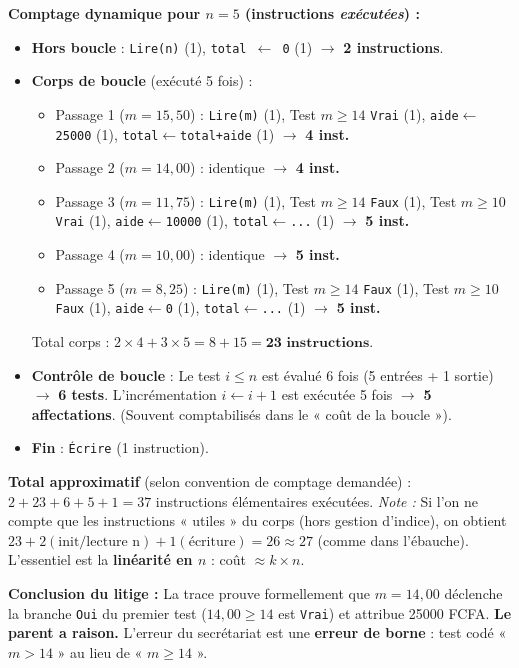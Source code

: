 \documentclass[11pt]{article}
\begin{document}
\begin{exoresolu}
\textbf{Comptage dynamique pour $n = 5$ (instructions \emph{exécutées}) :}
\begin{itemize}
  \item \textbf{Hors boucle} : \texttt{Lire(n)} (1), \texttt{total $\leftarrow$ 0} (1) $\rightarrow$ \textbf{2 instructions}.
  \item \textbf{Corps de boucle} (exécuté 5 fois) :
        \begin{itemize}
          \item Passage 1 ($m=15,50$) : \texttt{Lire(m)} (1), Test $m\geq14$ \texttt{Vrai} (1), \texttt{aide$\leftarrow$25000} (1), \texttt{total$\leftarrow$total+aide} (1) $\rightarrow$ \textbf{4 inst.}
          \item Passage 2 ($m=14,00$) : identique $\rightarrow$ \textbf{4 inst.}
          \item Passage 3 ($m=11,75$) : \texttt{Lire(m)} (1), Test $m\geq14$ \texttt{Faux} (1), Test $m\geq10$ \texttt{Vrai} (1), \texttt{aide$\leftarrow$10000} (1), \texttt{total$\leftarrow$...} (1) $\rightarrow$ \textbf{5 inst.}
          \item Passage 4 ($m=10,00$) : identique $\rightarrow$ \textbf{5 inst.}
          \item Passage 5 ($m=8,25$) : \texttt{Lire(m)} (1), Test $m\geq14$ \texttt{Faux} (1), Test $m\geq10$ \texttt{Faux} (1), \texttt{aide$\leftarrow$0} (1), \texttt{total$\leftarrow$...} (1) $\rightarrow$ \textbf{5 inst.}
        \end{itemize}
        Total corps : $2 \times 4 + 3 \times 5 = 8 + 15 = \textbf{23 instructions}$.
  \item \textbf{Contrôle de boucle} : Le test $i \leq n$ est évalué 6 fois (5 entrées + 1 sortie) $\rightarrow$ \textbf{6 tests}. L'incrémentation $i \leftarrow i+1$ est exécutée 5 fois $\rightarrow$ \textbf{5 affectations}. (Souvent comptabilisés dans le « coût de la boucle »).
  \item \textbf{Fin} : \texttt{Écrire} (1 instruction).
\end{itemize}
\textbf{Total approximatif} (selon convention de comptage demandée) : $2 + 23 + 6 + 5 + 1 = 37$ instructions élémentaires exécutées.
\textit{Note :} Si l'on ne compte que les instructions « utiles » du corps (hors gestion d'indice), on obtient $23 + 2 (\text{init/lecture n}) + 1 (\text{écriture}) = 26 \approx 27$ (comme dans l'ébauche). L'essentiel est la \textbf{linéarité en $n$} : coût $\approx k \times n$.

\textbf{Conclusion du litige :} La trace prouve formellement que $m = 14{,}00$ déclenche la branche \texttt{Oui} du premier test ($14{,}00 \geq 14$ est \texttt{Vrai}) et attribue \num{25000} FCFA. \textbf{Le parent a raison.} L'erreur du secrétariat est une \textbf{erreur de borne} : test codé « $m > 14$ » au lieu de « $m \geq 14$ ».


\end{exoresolu}
\end{document}
